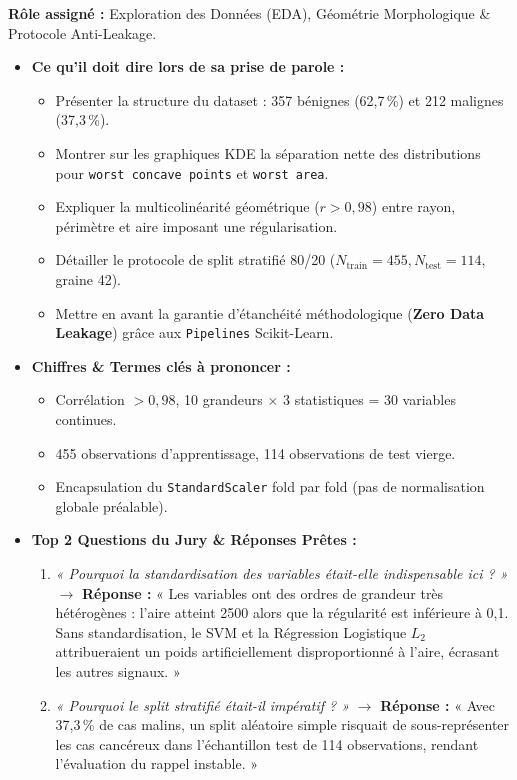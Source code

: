 \documentclass[10pt,a4paper]{article}
\begin{document}
\begin{tcolorbox}[memberbox, title={2. Zakarya KAIROUCH (Master M2SI) -- Slides 4 et 5 (~2 min)}]
\textbf{Rôle assigné :} Exploration des Données (EDA), Géométrie Morphologique \& Protocole Anti-Leakage.
\begin{itemize}[leftmargin=0.5cm, itemsep=2pt]
	\item \textbf{Ce qu'il doit dire lors de sa prise de parole :}
	\begin{itemize}
		\item Présenter la structure du dataset : 357 bénignes (62,7\,\%) et 212 malignes (37,3\,\%).
		\item Montrer sur les graphiques KDE la séparation nette des distributions pour \texttt{worst concave points} et \texttt{worst area}.
		\item Expliquer la multicolinéarité géométrique ($r > 0,98$) entre rayon, périmètre et aire imposant une régularisation.
		\item Détailler le protocole de split stratifié 80/20 ($N_{\text{train}}=455, N_{\text{test}}=114$, graine 42).
		\item Mettre en avant la garantie d'étanchéité méthodologique (\textbf{Zero Data Leakage}) grâce aux \texttt{Pipelines} Scikit-Learn.
	\end{itemize}
	\item \textbf{Chiffres \& Termes clés à prononcer :}
	\begin{itemize}
		\item Corrélation $> 0,98$, 10 grandeurs $\times$ 3 statistiques = 30 variables continues.
		\item 455 observations d'apprentissage, 114 observations de test vierge.
		\item Encapsulation du \texttt{StandardScaler} fold par fold (pas de normalisation globale préalable).
	\end{itemize}
	\item \textbf{Top 2 Questions du Jury \& Réponses Prêtes :}
	\begin{enumerate}
		\item \textit{« Pourquoi la standardisation des variables était-elle indispensable ici ? »}  
		$\rightarrow$ \textbf{Réponse :} « Les variables ont des ordres de grandeur très hétérogènes : l'aire atteint 2500 alors que la régularité est inférieure à 0,1. Sans standardisation, le SVM et la Régression Logistique $L_2$ attribueraient un poids artificiellement disproportionné à l'aire, écrasant les autres signaux. »
		\item \textit{« Pourquoi le split stratifié était-il impératif ? »}  
		$\rightarrow$ \textbf{Réponse :} « Avec 37,3\,\% de cas malins, un split aléatoire simple risquait de sous-représenter les cas cancéreux dans l'échantillon test de 114 observations, rendant l'évaluation du rappel instable. »
	\end{enumerate}
\end{itemize}
\end{tcolorbox}
\end{document}
